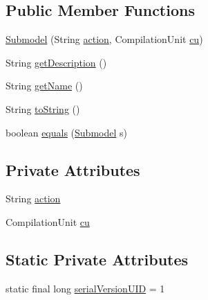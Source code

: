 \subsection*{Public Member Functions}
\begin{DoxyCompactItemize}
\item 
\hyperlink{classit_1_1isislab_1_1masonassisteddocumentation_1_1_o_d_d_1_1_submodel_a295090be40b2425ff47b0df06a0a8fcb}{Submodel} (String \hyperlink{classit_1_1isislab_1_1masonassisteddocumentation_1_1_o_d_d_1_1_submodel_af81356d376de8ea0609a727812d8af16}{action}, Compilation\-Unit \hyperlink{classit_1_1isislab_1_1masonassisteddocumentation_1_1_o_d_d_1_1_submodel_add685fad5849351f5a5bbdec1ebc49a5}{cu})
\item 
String \hyperlink{classit_1_1isislab_1_1masonassisteddocumentation_1_1_o_d_d_1_1_submodel_a4174d83304f84ad1c026c8096ea3a987}{get\-Description} ()
\item 
String \hyperlink{classit_1_1isislab_1_1masonassisteddocumentation_1_1_o_d_d_1_1_submodel_a52d60158adf71622ba8554abb72a12b9}{get\-Name} ()
\item 
String \hyperlink{classit_1_1isislab_1_1masonassisteddocumentation_1_1_o_d_d_1_1_submodel_a15e128a6ac94c77a75d85a903a2d40a4}{to\-String} ()
\item 
boolean \hyperlink{classit_1_1isislab_1_1masonassisteddocumentation_1_1_o_d_d_1_1_submodel_afef2a783ff6aaf811ced69506a527265}{equals} (\hyperlink{classit_1_1isislab_1_1masonassisteddocumentation_1_1_o_d_d_1_1_submodel}{Submodel} s)
\end{DoxyCompactItemize}
\subsection*{Private Attributes}
\begin{DoxyCompactItemize}
\item 
String \hyperlink{classit_1_1isislab_1_1masonassisteddocumentation_1_1_o_d_d_1_1_submodel_af81356d376de8ea0609a727812d8af16}{action}
\item 
Compilation\-Unit \hyperlink{classit_1_1isislab_1_1masonassisteddocumentation_1_1_o_d_d_1_1_submodel_add685fad5849351f5a5bbdec1ebc49a5}{cu}
\end{DoxyCompactItemize}
\subsection*{Static Private Attributes}
\begin{DoxyCompactItemize}
\item 
static final long \hyperlink{classit_1_1isislab_1_1masonassisteddocumentation_1_1_o_d_d_1_1_submodel_a3a803e7616f2ac4e588f6b8ba0e7b6d0}{serial\-Version\-U\-I\-D} = 1
\end{DoxyCompactItemize}


